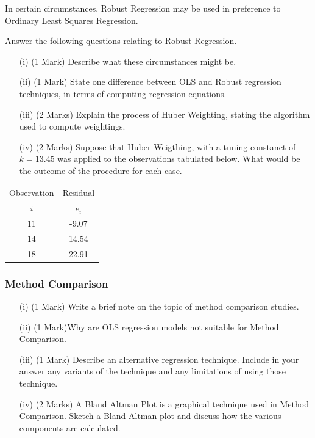 \documentclass[a4paper,12pt]{article}
\begin{document}
In certain circumstances, Robust Regression may be used in preference to Ordinary Least Squares Regression. 

Answer the following questions relating to Robust Regression. 

\begin{itemize}
	\item[(i)] (1 Mark) Describe what these circumstances might be.
	\item[(ii)] (1 Mark) State one difference between OLS and Robust regression techniques, in terms of computing regression equations.
	\item[(iii)] (2 Marks) Explain the process of Huber Weighting, stating the algorithm used to compute weightings.
	\item[(iv)] (2 Marks) Suppose that Huber Weigthing, with a tuning constanct of $k=13.45$ was applied to the observations 
	tabulated below. What would be the outcome of the procedure for each case. 
\end{itemize}
\begin{center}
\begin{tabular}{|c|c|}
	\hline
Observation & Residual \\ 
$i$  & $e_i$ \\ \hline
11 & -9.07 \\ \hline 
14 & 14.54 \\ \hline
18 & 22.91 \\ \hline
\end{tabular} 
\end{center}

\subsubsection*{Method Comparison}
\begin{itemize}
\item[(i)] (1 Mark) Write a brief note on the topic of method comparison studies.
\item[(ii)] (1 Mark)Why are OLS regression models not suitable for Method Comparison.
\item[(iii)] (1 Mark) Describe an alternative regression technique. Include in your answer any variants of the technique and any limitations of using those technique.

\item[(iv)] (2 Marks) A Bland Altman Plot is a graphical technique used in Method Comparison. Sketch a Bland-Altman plot and discuss how the various components are calculated.
\end{itemize}
\end{document}
